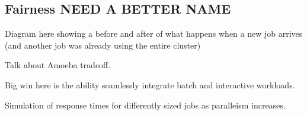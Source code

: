 \subsection{Fairness NEED A BETTER NAME}
Diagram here showing a before and after of what happens when a new job arrives
(and another job was already using the entire cluster)

Talk about Amoeba tradeoff.

Big win here is the ability seamlessly integrate batch and interactive workloads.

Simulation of response times for differently sized jobs as paralleism increases.

